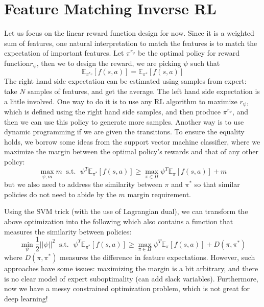 \section{Feature Matching Inverse RL}
Let us focus on the linear reward function design for now. Since it is a weighted sum of features, one natural interpretation to match the features is to match the expectation of important features. Let $\pi^{r_\psi}$ be the optimal policy for reward function$r_\psi$, then we to design the reward, we are picking $\psi$ such that 
\[
\mathbb{E}_{\pi^{r_\psi}}[f(s,a)] = \mathbb{E}_{\pi^*}[f(s,a)]
\]
The right hand side expectation can be estimated using samples from expert: take $N$ samples of features, and get the average. The left hand side expectation is a little involved. One way to do it is to use any RL algorithm to maximize $r_\psi$, which is defined using the right hand side samples, and then produce $\pi^{r_\psi}$, and then we can use this policy to generate more samples. Another way is to use dynamic programming if we are given the transitions. To ensure the equality holds, we borrow some ideas from the support vector machine classifier, where we maximize the margin between the optimal policy's rewards and that of any other policy:
\[
\max_{\psi,m} m\;\;\text{s.t. }\;\psi^T\mathbb{E}_{\pi^*}[f(s,a)]\geq \max_{\pi\in \Pi}\psi^T\mathbb{E}_\pi[f(s,a)]+m
\]
but we also need to address the similarity between $\pi$ and $\pi^*$ so that similar policies do not need to abide by the $m$ margin requirement.

Using the SVM trick (with the use of Lagrangian dual), we can transform the above optimization into the following which also contains a function that measures the similarity between policies:
\[
\min_\psi \frac{1}{2}\lvert|\psi|\rvert^2\;\; \text{s.t. }\;\psi^T\mathbb{E}_{\pi^*}[f(s,a)]\geq \max_{\pi\in \Pi}\psi^T\mathbb{E}_\pi[f(s,a)]+D(\pi,\pi^*)
\]
where $D(\pi,\pi^*)$ measures the difference in feature expectations. However, such approaches have some issues: maximizing the margin is a bit arbitrary, and there is no clear model of expert suboptimality (can add slack variables). Furthermore, now we have a messy constrained optimization problem, which is not great for deep learning!

